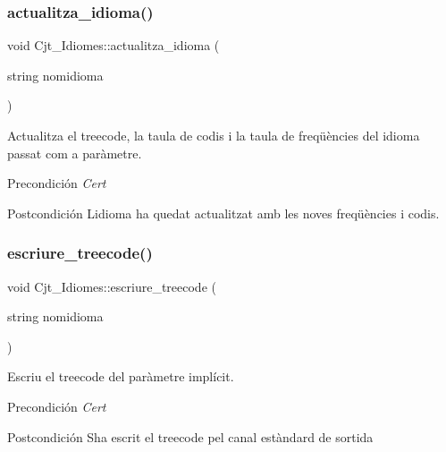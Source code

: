 \subsubsection{\texorpdfstring{actualitza\+\_\+idioma()}{actualitza\_idioma()}}
{\footnotesize\ttfamily void Cjt\+\_\+\+Idiomes\+::actualitza\+\_\+idioma (\begin{DoxyParamCaption}\item[{string}]{nomidioma }\end{DoxyParamCaption})}



Actualitza el treecode, la taula de codis i la taula de freqüències del idioma passat com a paràmetre. 

\begin{DoxyPrecond}{Precondición}
{\itshape Cert} 
\end{DoxyPrecond}
\begin{DoxyPostcond}{Postcondición}
L\textquotesingle{}idioma ha quedat actualitzat amb les noves freqüències i codis. 
\end{DoxyPostcond}
\mbox{\label{class_cjt___idiomes_a49666adf7e2a9cefc96d4b7b3d925710}} 
\subsubsection{\texorpdfstring{escriure\+\_\+treecode()}{escriure\_treecode()}}
{\footnotesize\ttfamily void Cjt\+\_\+\+Idiomes\+::escriure\+\_\+treecode (\begin{DoxyParamCaption}\item[{string}]{nomidioma }\end{DoxyParamCaption})}



Escriu el treecode del paràmetre implícit. 

\begin{DoxyPrecond}{Precondición}
{\itshape Cert} 
\end{DoxyPrecond}
\begin{DoxyPostcond}{Postcondición}
S\textquotesingle{}ha escrit el treecode pel canal estàndard de sortida 
\end{DoxyPostcond}
\mbox{\label{class_cjt___idiomes_afdad5e96949152abf75a9598224be426}} 
